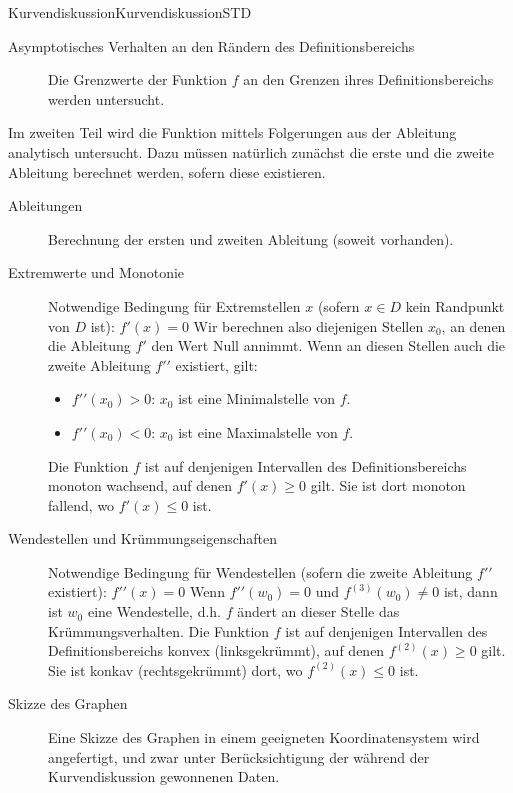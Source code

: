 \begin{MXContent}{Kurvendiskussion}{Kurvendiskussion}{STD}
\begin{description}
\item[Asymptotisches Verhalten an den Rändern des Definitionsbereichs]
Die Grenzwerte der Funktion $f$ an den Grenzen ihres Definitionsbereichs werden untersucht.
\end{description} 

Im zweiten Teil wird die Funktion mittels Folgerungen aus der Ableitung 
analytisch untersucht. Dazu müssen natürlich zunächst die erste und die zweite Ableitung 
berechnet werden, sofern diese existieren.

\begin{description}
\item[Ableitungen]
Berechnung der ersten und zweiten Ableitung (soweit vorhanden).

\item[Extremwerte und Monotonie]
Notwendige Bedingung für Extremstellen $x$ (sofern $x \in D$ kein Randpunkt von $D$ ist): $f'(x) = 0$\newline
Wir berechnen also diejenigen Stellen $x_0$, an denen die Ableitung $f'$ den Wert Null annimmt. Wenn an diesen Stellen auch die zweite
Ableitung ${f'}'$ existiert, gilt:
\begin{itemize}
 \item ${f'}'(x_0) > 0$: $x_0$ ist eine Minimalstelle von $f$.
\item ${f'}'(x_0) < 0$: $x_0$ ist eine Maximalstelle von $f$.
\end{itemize}
Die Funktion $f$ ist auf denjenigen Intervallen des Definitionsbereichs monoton
wachsend, auf denen $f'(x) \geq 0$ gilt. Sie ist dort monoton fallend, wo $f'(x) \leq 0$ 
ist.

\item[Wendestellen und Krümmungseigenschaften]
Notwendige Bedingung für Wendestellen (sofern die zweite Ableitung ${f'}'$ existiert): ${f'}'(x) = 0$\newline
Wenn ${f'}'(w_0) = 0$ und $f^{(3)}(w_0) \neq 0$ ist, dann ist $w_0$ eine Wendestelle, d.h. $f$ ändert an dieser Stelle das Krümmungsverhalten.\newline
Die Funktion $f$ ist auf denjenigen Intervallen des Definitionsbereichs konvex
(linksgekrümmt), auf denen $f^{(2)}(x) \geq 0$ gilt. Sie ist konkav (rechtsgekrümmt) dort, 
wo $f^{(2)}(x) \leq 0$ ist.

\item[Skizze des Graphen] Eine Skizze des Graphen in einem geeigneten Koordinatensystem wird angefertigt, und zwar unter
Berücksichtigung der während der Kurvendiskussion gewonnenen Daten.
\end{description}


\end{MXContent}
